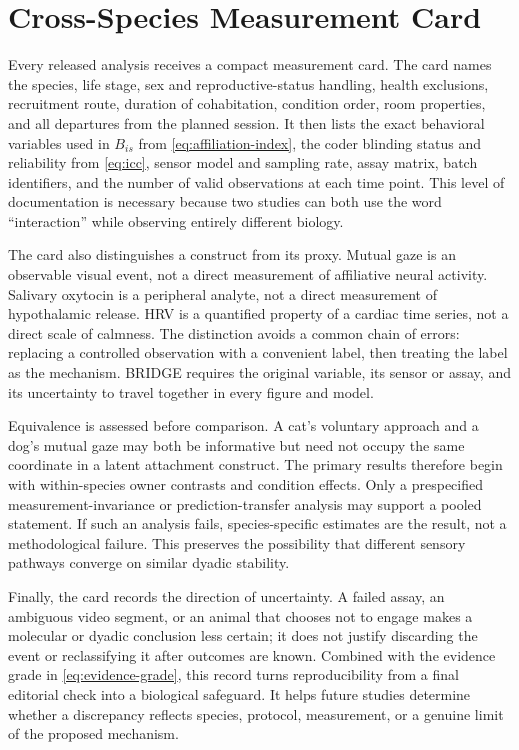 \documentclass[conference]{IEEEtran}
\begin{document}
\section{Cross-Species Measurement Card}

Every released analysis receives a compact measurement card. The card names the species, life stage, sex and reproductive-status handling, health exclusions, recruitment route, duration of cohabitation, condition order, room properties, and all departures from the planned session. It then lists the exact behavioral variables used in $B_{is}$ from \eqref{eq:affiliation-index}, the coder blinding status and reliability from \eqref{eq:icc}, sensor model and sampling rate, assay matrix, batch identifiers, and the number of valid observations at each time point. This level of documentation is necessary because two studies can both use the word ``interaction'' while observing entirely different biology.

The card also distinguishes a construct from its proxy. Mutual gaze is an observable visual event, not a direct measurement of affiliative neural activity. Salivary oxytocin is a peripheral analyte, not a direct measurement of hypothalamic release. HRV is a quantified property of a cardiac time series, not a direct scale of calmness. The distinction avoids a common chain of errors: replacing a controlled observation with a convenient label, then treating the label as the mechanism. BRIDGE requires the original variable, its sensor or assay, and its uncertainty to travel together in every figure and model.

Equivalence is assessed before comparison. A cat's voluntary approach and a dog's mutual gaze may both be informative but need not occupy the same coordinate in a latent attachment construct. The primary results therefore begin with within-species owner contrasts and condition effects. Only a prespecified measurement-invariance or prediction-transfer analysis may support a pooled statement. If such an analysis fails, species-specific estimates are the result, not a methodological failure. This preserves the possibility that different sensory pathways converge on similar dyadic stability.

Finally, the card records the direction of uncertainty. A failed assay, an ambiguous video segment, or an animal that chooses not to engage makes a molecular or dyadic conclusion less certain; it does not justify discarding the event or reclassifying it after outcomes are known. Combined with the evidence grade in \eqref{eq:evidence-grade}, this record turns reproducibility from a final editorial check into a biological safeguard. It helps future studies determine whether a discrepancy reflects species, protocol, measurement, or a genuine limit of the proposed mechanism.
\end{document}
